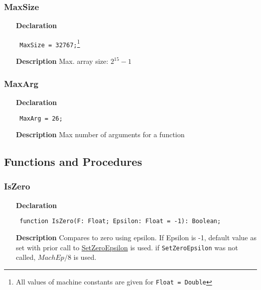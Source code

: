 \documentclass[12pt,a4paper,oneside]{report}
\newcommand{\lmath}[1]{   %
	\marginpar{\vspace{#1} 
		\begin{flushright}
			LMath
	\end{flushright} }
}
\newcommand{\declarationitem}[1]{\textbf{#1}}
\newcommand{\descriptiontitle}[1]{\textbf{#1}}
\newcommand{\code}[1]{\texttt{#1}}
\begin{document}
\subsubsection{MaxSize}
\label{utypes-MaxSize}
\begin{itemize}\item[\declarationitem{Declaration}\hfill]
	\begin{flushleft}
		\code{
			MaxSize = 32767;}\footnote{All values of machine constants are given for \code{Float = Double}}
		
	\end{flushleft}
	
	\par
	\item[\descriptiontitle{Description}]
	Max. array size: $2^{15}-1$
	
\end{itemize}
\subsubsection{MaxArg}
\label{utypes-MaxArg}
\begin{itemize}\item[\declarationitem{Declaration}\hfill]
	\begin{flushleft}
		\code{
			MaxArg = 26;}
		
	\end{flushleft}
	
	\par
	\item[\descriptiontitle{Description}]
	Max number of arguments for a function
\end{itemize}

\subsection{Functions and Procedures}
\subsubsection{IsZero}
\lmath{-24pt}
\label{utypes-IsZero}
\begin{itemize}\item[\declarationitem{Declaration}\hfill]
	\begin{flushleft}
		\code{
			function IsZero(F: Float; Epsilon: Float = -1): Boolean;}
		
	\end{flushleft}
	
	\par
	\item[\descriptiontitle{Description}]
Compares to zero using epsilon. If Epsilon is {-}1, default value as set with prior call to \hyperref[utypes-SetZeroEpsilon]{SetZeroEpsilon} is used. if \code{SetZeroEpsilon} was not called, $MachEp / 8$ is used.	
\end{itemize}
\end{document}
